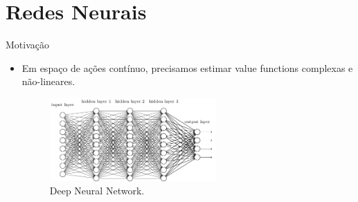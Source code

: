 \documentclass{beamer}
\begin{document}




\section{Redes Neurais}

\begin{frame}{Motivação}
\begin{itemize}
\item
	Em espaço de ações contínuo, precisamos estimar value functions complexas e não-lineares.
	\begin{figure}[H]
    \centering
    \includegraphics[width=0.6\textwidth]{figures/deep_neural_net.png} 
    \caption{Deep Neural Network.}
    \label{fig:RL_basic_model}
	\end{figure}
\end{itemize}
\end{frame}
\end{document}
